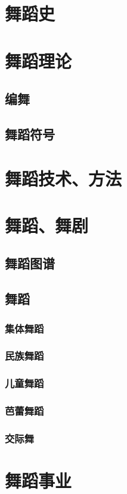 \documentclass[UTF8]{../RepresentationUniverse}
\begin{document}
\section{舞蹈史}

\section{舞蹈理论}
    \subsection{编舞}
    \subsection{舞蹈符号}

\section{舞蹈技术、方法}


\section{舞蹈、舞剧}
    \subsection{舞蹈图谱}
    \subsection{舞蹈}
        \subsubsection{集体舞蹈}
        \subsubsection{民族舞蹈}
        \subsubsection{儿童舞蹈}
        \subsubsection{芭蕾舞蹈}
        \subsubsection{交际舞}
\section{舞蹈事业}
\end{document}
